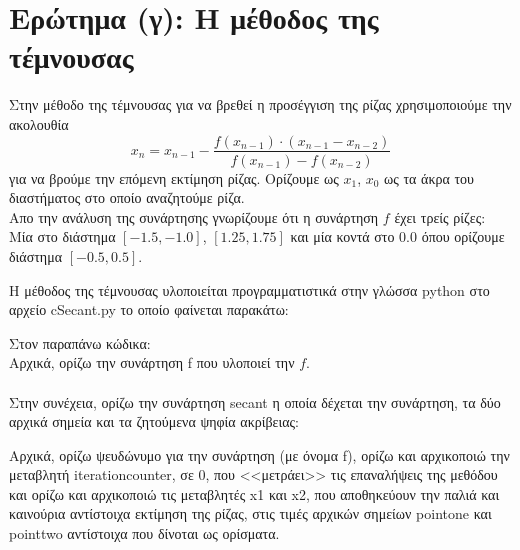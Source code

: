 \documentclass[a4paper,11pt]{article}
\newcommand{\lt}{\latintext}
\newcommand{\gt}{\greektext}
\begin{document}
\section{Ερώτημα (γ): H μέθοδος της τέμνουσας}

Στην μέθοδο της τέμνουσας για να βρεθεί η προσέγγιση της ρίζας χρησιμοποιούμε την ακολουθία
\[ x_n = x_{n-1} - \dfrac{f(x_{n-1}) \cdot (x_{n-1} - x_{n-2})}{f(x_{n-1}) - f(x_{n-2})} \]
για να βρούμε την επόμενη εκτίμηση ρίζας. Ορίζουμε ως $x_1$, $x_0$ ως τα άκρα του διαστήματος στο οποίο αναζητούμε ρίζα.\\

Απο την ανάλυση της συνάρτησης γνωρίζουμε ότι η συνάρτηση $f$ έχει τρείς ρίζες: Μία στο διάστημα $[-1.5, -1.0]$, $[1.25, 1.75]$ και μία κοντά στο $0.0$ όπου ορίζουμε διάστημα $[-0.5, 0.5]$.

Η μέθοδος της τέμνουσας υλοποιείται προγραμματιστικά στην γλώσσα {\lt python} στο αρχείο {\lt c\textunderscore Secant.py} το οποίο φαίνεται παρακάτω:

\lt

\gt

Στον παραπάνω κώδικα:
\\
Αρχικά, ορίζω την συνάρτηση {\lt f} που υλοποιεί την $f$.\\
\\
Στην συνέχεια, ορίζω την συνάρτηση {\lt secant} η οποία δέχεται την συνάρτηση, τα δύο αρχικά σημεία και τα ζητούμενα ψηφία ακρίβειας:\par
Αρχικά, ορίζω ψευδώνυμο για την συνάρτηση (με όνομα {\lt f}), ορίζω και αρχικοποιώ την μεταβλητή {\lt iteration\textunderscore counter}, σε 0,  που <<μετράει>> τις επαναλήψεις της μεθόδου και ορίζω και αρχικοποιώ τις μεταβλητές {\lt x1} και {\lt x2}, που αποθηκεύουν την παλιά και καινούρια αντίστοιχα εκτίμηση της ρίζας, στις τιμές αρχικών σημείων {\lt point\textunderscore one} και {\lt point\textunderscore two} αντίστοιχα που δίνοται ως ορίσματα.
\end{document}
